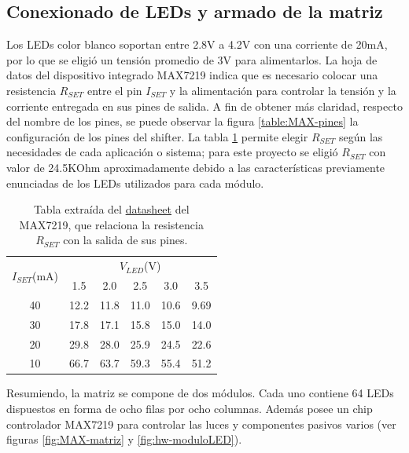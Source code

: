     \subsection{Conexionado de LEDs y armado de la matriz}
    Los LEDs color blanco soportan entre 2.8V a 4.2V con una corriente de 20mA, por lo que se eligió un tensión promedio de 3V para alimentarlos. La hoja de datos del dispositivo integrado MAX7219 indica que es necesario colocar una resistencia $R_{SET}$ entre el pin $I_{SET}$ y la alimentación para controlar la tensión y la corriente entregada en sus pines de salida. A fin de obtener más claridad, respecto del nombre de los pines, se puede observar la figura \ref{table:MAX-pines} la configuración de los pines del shifter. La tabla \ref{table-RIsec} permite elegir $R_{SET}$ según las necesidades de cada aplicación o sistema; para este proyecto se eligió $R_{SET}$ con valor de 24.5KOhm aproximadamente debido a las características previamente enunciadas de los LEDs utilizados para cada módulo.\newline

    \begin{table}[ht]
        \centering
        \caption{Tabla extraída del \href{https://datasheets.maximintegrated.com/en/ds/MAX7219-MAX7221.pdf}{datasheet} del MAX7219, que relaciona la resistencia $R_{SET}$ con la salida de sus pines.}
        \vspace{2mm}
        \label{table-RIsec}
        \begin{tabular}{|c|ccccc|}\hline
        \multirow{2}{*}{$I_{SET}$(mA)} & \multicolumn{5}{c|}{$V_{LED}$(V)}   \\ \cline{2-6}
                    & 1.5  & 2.0  & 2.5  & 3.0  & 3.5  \\ \hline
        40          & 12.2 & 11.8 & 11.0 & 10.6 & 9.69 \\
        30          & 17.8 & 17.1 & 15.8 & 15.0 & 14.0 \\
        20          & 29.8 & 28.0 & 25.9 & 24.5 & 22.6 \\
        10          & 66.7 & 63.7 & 59.3 & 55.4 & 51.2 \\ \hline
        \end{tabular}
    \end{table}

    Resumiendo, la matriz se compone de dos módulos. Cada uno contiene 64 LEDs dispuestos en forma de ocho filas por ocho columnas. Además posee un chip controlador MAX7219 para controlar las luces y componentes pasivos varios (ver figuras \ref{fig:MAX-matriz} y \ref{fig:hw-moduloLED}).
    
